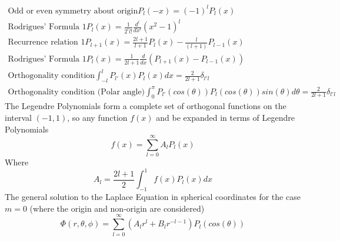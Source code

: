 \documentclass[12pt]{article}
\begin{document}
        \begin{gather*}
            \text{Odd or even symmetry about origin} P_l(-x) = (-1)^l P_l(x) 
            \\ \text{Rodrigues' Formula 1} P_l(x) = \frac{1}{2^l l!} \frac{d^l}{dx^l} (x^2 - 1)^l
            \\ \text{Recurrence relation 1} P_{l+1}(x) = \frac{2 l + 1}{l+1} P_l(x) - \frac{l}{(l+1)} P_{l-1}(x)
            \\ \text{Rodrigues' Formula 1} P_l(x) = \frac{1}{2 l + 1} \frac{d}{dx} (P_{l+1}(x) - P_{l-1}(x))
            \\ \text{Orthogonality condition} \int_{-l}^l P_{l'}(x) P_l(x)dx = \frac{2}{2l + 1} \delta_{l'l}
            \\ \text{Orthogonality condition (Polar angle)} \int_0^\pi P_{l'}(cos(\theta)) P_l(cos(\theta)) sin(\theta) d\theta = \frac{2}{2l+1}\delta_{l'l}
        \end{gather*}
        The Legendre Polynomials form a complete set of orthogonal functions on the interval $(-1,1)$, so any function $f(x)$ and be expanded in terms of Legendre Polynomials
        \begin{equation} \label{eq: a2-41}
            f(x) = \sum_{l=0}^\infty A_l P_l(x)
        \end{equation}
        Where 
        \begin{equation} \label{eq: a2-42}
            A_l = \frac{2l+1}{2} \int_{-1}^1 f(x) P_l(x) dx
        \end{equation}
        The general solution to the Laplace Equation in spherical coordinates for the case $m=0$ (where the origin and non-origin are considered)
        \begin{equation} \label{eq: a2-43}
            \Phi(r,\theta, \phi) = \sum_{l=0}^\infty (A_l r^l + B_l r^{-l-1}) P_l(cos(\theta))
        \end{equation}
    
\newpage
\printbibliography
\end{document}

